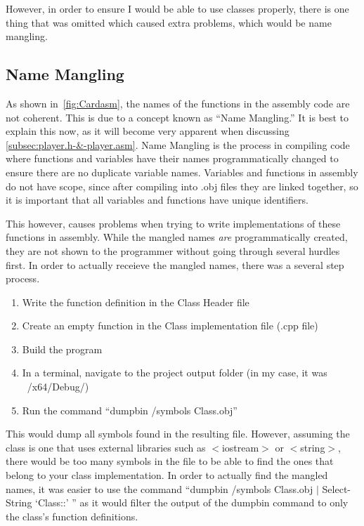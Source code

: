 \documentclass[twoside]{article}
\begin{document}
    \noindent
    However, in order to ensure I would be able to use classes properly, there is one thing that was omitted which caused extra problems, which would be name mangling.

    \subsection{Name Mangling}\label{subsec:name-mangling}
    As shown in~\ref{fig:Cardasm}, the names of the functions in the assembly code are not coherent.
    This is due to a concept known as ``Name Mangling.''
    It is best to explain this now, as it will become very apparent when discussing \ref{subsec:player.h-&-player.asm}.
    Name Mangling is the process in compiling code where functions and variables have their names programmatically changed to ensure there are no duplicate variable names.
    Variables and functions in assembly do not have scope, since after compiling into .obj files they are linked together, so it is important that all variables and functions have unique identifiers.

    \bigbreak
    \noindent
    This however, causes problems when trying to write implementations of these functions in assembly.
    While the mangled names \emph{are} programmatically created, they are not shown to the programmer without going through several hurdles first.
    In order to actually receieve the mangled names, there was a several step process.
    \begin{enumerate}
        \item Write the function definition in the Class Header file
        \item Create an empty function in the Class implementation file (.cpp file)
        \item Build the program
        \item In a terminal, navigate to the project output folder (in my case, it was ~/x64/Debug/)
        \item Run the command ``dumpbin /symbols Class.obj''
    \end{enumerate}
    This would dump all symbols found in the resulting file.
    However, assuming the class is one that uses external libraries such as $<$iostream$>$ or $<$string$>$, there would be too many symbols in the file to be able to find the ones that belong to your class implementation.
    In order to actually find the mangled names, it was easier to use the command ``dumpbin /symbols Class.obj $|$ Select-String `Class::' '' as it would filter the output of the dumpbin command to only the class's function definitions.
\end{document}
